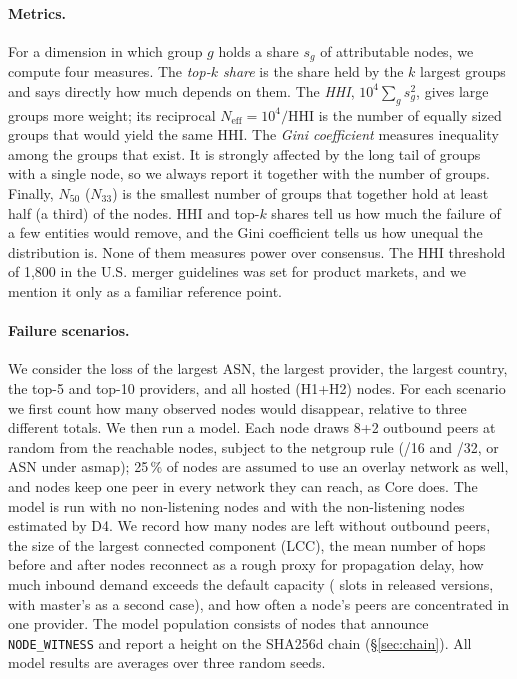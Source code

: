 \documentclass[10pt,a4paper]{article}
\begin{document}
\paragraph{Metrics.} For a dimension in which group $g$ holds a share $s_g$ of attributable nodes, we compute four measures. The \emph{top-$k$ share} is the share held by the $k$ largest groups and says directly how much depends on them. The \emph{HHI}, $10^4\sum_g s_g^2$, gives large groups more weight; its reciprocal $N_\text{eff}=10^4/\text{HHI}$ is the number of equally sized groups that would yield the same HHI. The \emph{Gini coefficient} measures inequality among the groups that exist. It is strongly affected by the long tail of groups with a single node, so we always report it together with the number of groups. Finally, $N_{50}$ ($N_{33}$) is the smallest number of groups that together hold at least half (a third) of the nodes. HHI and top-$k$ shares tell us how much the failure of a few entities would remove, and the Gini coefficient tells us how unequal the distribution is. None of them measures power over consensus. The HHI threshold of 1{,}800 in the U.S. merger guidelines \cite{doj2023merger} was set for product markets, and we mention it only as a familiar reference point.

\paragraph{Failure scenarios.} We consider the loss of the largest ASN, the largest provider, the largest country, the top-5 and top-10 providers, and all hosted (H1+H2) nodes. For each scenario we first count how many observed nodes would disappear, relative to three different totals. We then run a model. Each node draws 8+2 outbound peers at random from the reachable nodes, subject to the netgroup rule (/16 and /32, or ASN under asmap); 25\,\% of nodes are assumed to use an overlay network as well, and nodes keep one peer in every network they can reach, as Core does. The model is run with no non-listening nodes and with the \LukeUnreach{} non-listening nodes estimated by D4. We record how many nodes are left without outbound peers, the size of the largest connected component (LCC), the mean number of hops before and after nodes reconnect as a rough proxy for propagation delay, how much inbound demand exceeds the default capacity (\InboundCap{} slots in released versions, with master's \InboundCapMaster{} as a second case), and how often a node's peers are concentrated in one provider. The model population consists of nodes that announce \texttt{NODE\_\allowbreak{}WITNESS} and report a height on the SHA256d chain (\S\ref{sec:chain}). All model results are averages over three random seeds.
\end{document}
